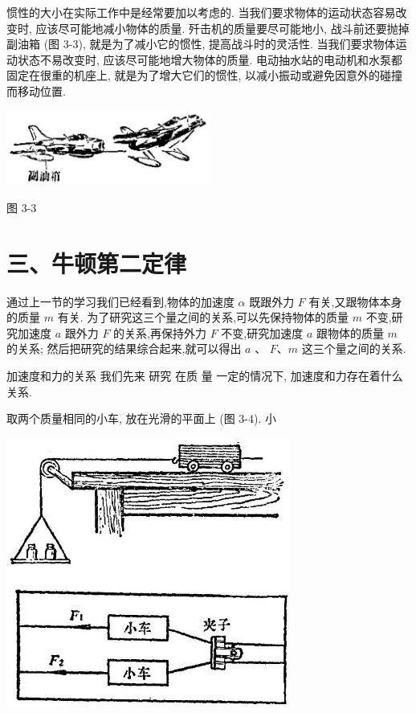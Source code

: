 \documentclass[10pt]{article}
\begin{document}
惯性的大小在实际工作中是经常要加以考虑的. 当我们要求物体的运动状态容易改变时, 应该尽可能地减小物体的质量. 歼击机的质量要尽可能地小, 战斗前还要抛掉副油箱 (图 3-3), 就是为了减小它的惯性, 提高战斗时的灵活性. 当我们要求物体运动状态不易改变时, 应该尽可能地增大物体的质量. 电动抽水站的电动机和水泵都固定在很重的机座上, 就是为了增大它们的惯性, 以减小振动或避免因意外的碰撞而移动位置.

\begin{center}
\includegraphics[max width=0.5\textwidth]{images/01912d55-147c-70aa-b0e0-1782a122f948_95_285917.jpg}
\end{center}

图 3-3

\section*{三、牛顿第二定律}

通过上一节的学习我们已经看到,物体的加速度 \(\alpha\) 既跟外力 \(F\) 有关,又跟物体本身的质量 \(m\) 有关. 为了研究这三个量之间的关系,可以先保持物体的质量 \(m\) 不变,研究加速度 \(a\) 跟外力 \(F\) 的关系,再保持外力 \(F\) 不变,研究加速度 \(a\) 跟物体的质量 \(m\) 的关系; 然后把研究的结果综合起来,就可以得出 \(a\) 、 \(F\text{、}m\) 这三个量之间的关系.

加速度和力的关系 我们先来 研究 在质 量 一定的情况下, 加速度和力存在着什么关系.

取两个质量相同的小车, 放在光滑的平面上 (图 3-4). 小

\begin{center}
\includegraphics[max width=0.7\textwidth]{images/01912d55-147c-70aa-b0e0-1782a122f948_96_469510.jpg}
\end{center}
\end{document}
